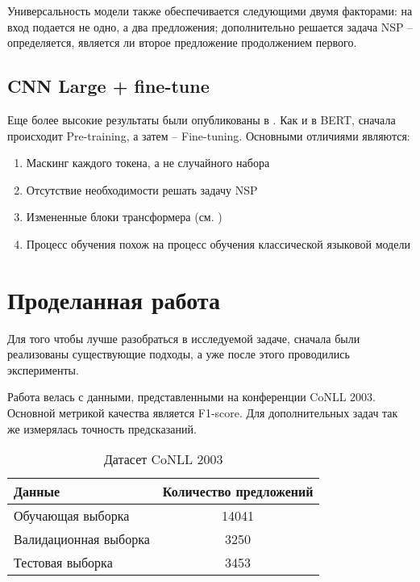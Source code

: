 \documentclass[a4paper,14pt]{extarticle}
\begin{document}

Универсальность модели также обеспечивается следующими двумя факторами: на вход подается не одно, а два предложения; дополнительно решается задача NSP -- определяется, является ли второе предложение продолжением первого.


\clearpage

\subsection{CNN Large + fine-tune}

Еще более высокие результаты были опубликованы в \cite{1903.07785}. Как и в BERT, сначала происходит Pre-training, а затем -- Fine-tuning. Основными отличиями являются:
\begin{enumerate}
    \item Маскинг каждого токена, а не случайного набора
    \item Отсутствие необходимости решать задачу NSP
    \item Измененные блоки трансформера (см. \cite{1706.03762})
    \item Процесс обучения похож на процесс обучения классической языковой модели
\end{enumerate}

\clearpage

\section{Проделанная работа}

Для того чтобы лучше разобраться в исследуемой задаче, сначала были реализованы существующие подходы, а уже после этого проводились эксперименты.

Работа велась с данными, представленными на конференции CoNLL 2003. Основной метрикой качества является F1-score. Для дополнительных задач так же измерялась точность предсказаний.

\begin{table}[H]
    \caption{Датасет CoNLL 2003}
    \label{progress}
    \begin{center}
    \begin{tabular}{l|c}
        Данные                & Количество предложений \\
        \hline
        Обучающая выборка     & 14041                  \\
        Валидационная выборка & 3250                   \\
        Тестовая выборка      & 3453                   \\
    \end{tabular}
    \end{center}
\end{table}
\end{document}
